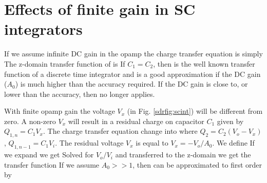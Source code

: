 \section{Effects of finite gain in SC integrators}
\label{sdrap:intgain}
If we assume infinite DC gain in the opamp the
charge transfer equation is simply
The z-domain transfer function of   is
If $C_1 =C_2$, then  is the well known transfer function of
a discrete time integrator and is a good approximation if the
DC gain ($A_0$) is much higher than the accuracy required. If the DC gain is close to,
or lower than the accuracy, then  no longer applies.

With finite opamp gain the voltage $V_x$ (in Fig. \ref{sdrfig:scint}) will be different from
zero. A non-zero $V_x$
will result in  a
residual charge on capacitor $C_1$ given by $Q_{1,n} = C_1
V_x$. The
charge transfer equation change into
where $Q_2 = C_2 (V_o - V_x)$, $Q_{1,n-1} = C_1 V_i$. The residual
voltage $V_x$ is equal to $V_x = -V_o/A_0$. We define
If we expand  we get
Solved for $V_o/V_i$ and transferred to the z-domain we get the
transfer function
If we assume $A_0>>1$, then  can be approximated to first
order by

